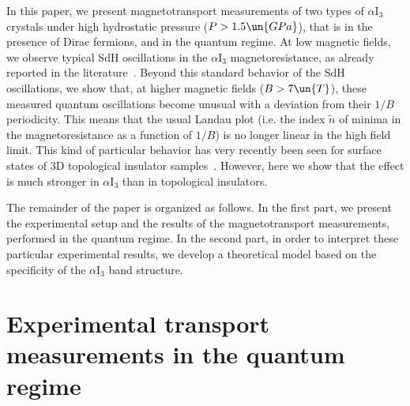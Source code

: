 \documentclass[doublecol]{epl2}
\begin{document}
In this paper, we present magnetotransport measurements of two types of $\alpha$I$_{3}$ crystals under high hydrostatic pressure ($P>1.5\un{GPa}$), 
that is in the presence of Dirac fermions, and in the quantum regime. At low magnetic fields, we observe typical SdH oscillations in the $\alpha$I$_{3}$ 
magnetoresistance, as already reported in the literature~\cite{alphaSdHOscillations}. Beyond this standard behavior of the SdH oscillations, we show that, 
at higher magnetic fields ($B>7\un{T}$), these measured 
quantum oscillations become unusual with a deviation from their $1/B$ periodicity. This means that the usual Landau plot (i.e. the index $\tilde{n}$ of minima in the 
magnetoresistance as a function of $1/B$) is no longer linear in the high field limit. This kind of particular behavior has very recently been seen for surface states of 3D topological insulator samples~\cite{TopolInsulatorsExperience1,TopolInsulatorsExperience2,TopolInsulatorsMcKenzie}. However, here we show that the effect is much stronger in $\alpha$I$_{3}$ than in topological insulators. 

The remainder of the paper is organized as follows. In the first part, we present the experimental setup and the results of the magnetotransport measurements, performed in the quantum regime. In the second part, in order to interpret these particular experimental results, we develop a theoretical model based on the specificity of the $\alpha$I$_{3}$ band structure.  


\section{Experimental transport measurements in the quantum regime}
\end{document}
